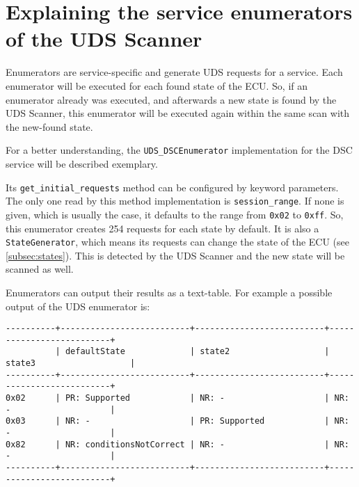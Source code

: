 \section{Explaining the service enumerators of the UDS Scanner}
\label{sec:enumerators}

Enumerators are service-specific and generate UDS requests for a service.
Each enumerator will be executed for each found state of the ECU. So, if an enumerator already was executed, and afterwards a new state is found by the UDS Scanner, this enumerator will be executed again within the same scan with the new-found state.

For a better understanding, the \texttt{UDS_DSCEnumerator} implementation for the DSC service will be described exemplary.


Its \texttt{get_initial_requests} method can be configured by keyword parameters. The only one read by this method implementation is \texttt{session_range}. If none is given, which is usually the case, it defaults to the range from \texttt{0x02} to \texttt{0xff}. So, this enumerator creates 254 requests for each state by default. It is also a \texttt{StateGenerator}, which means its requests can change the state of the ECU (see \autoref{subsec:states}). This is detected by the UDS Scanner and the new state will be scanned as well.

Enumerators can output their results as a text-table. For example a possible output of the UDS enumerator is:

\begin{samepage}
\begin{verbatim}
----------+--------------------------+--------------------------+--------------------------+
          | defaultState             | state2                   | state3                   | 
----------+--------------------------+--------------------------+--------------------------+
0x02      | PR: Supported            | NR: -                    | NR: -                    | 
0x03      | NR: -                    | PR: Supported            | NR: -                    | 
0x82      | NR: conditionsNotCorrect | NR: -                    | NR: -                    | 
----------+--------------------------+--------------------------+--------------------------+
\end{verbatim}
\end{samepage}

